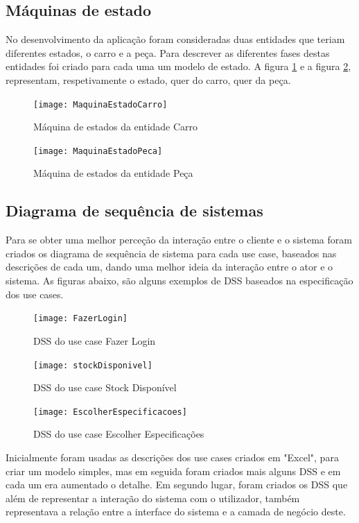 \documentclass[10pt, a4paper]{article}
\begin{document}
\subsection{Máquinas de estado}
No desenvolvimento da aplicação foram consideradas duas entidades que teriam diferentes estados, o carro e a peça. Para descrever as diferentes fases destas entidades foi criado para cada uma um modelo de estado. A figura \ref{ME_Carro} e a figura \ref{ME_Peca}, representam, respetivamente o estado, quer do carro, quer da peça.

\begin{figure}[!htb]
\centering
\texttt{[image: MaquinaEstadoCarro]}
\caption{Máquina de estados da entidade Carro}
\label{ME_Carro}
\end{figure}

\begin{figure}[!htb]
\centering
\texttt{[image: MaquinaEstadoPeca]}
\caption{Máquina de estados da entidade Peça}
\label{ME_Peca}
\end{figure}


\subsection{Diagrama de sequência de sistemas}
Para se obter uma melhor perceção da interação entre o cliente e o sistema foram criados os diagrama de sequência de sistema para cada use case, baseados nas descrições de cada um, dando uma melhor ideia da interação entre o ator e o sistema. As figuras abaixo, são alguns exemplos de DSS baseados na especificação dos use cases.

\begin{figure}[!htb]
\centering
\texttt{[image: FazerLogin]}
\caption{DSS do use case Fazer Login}
\label{DSS FL}
\end{figure}

\begin{figure}[!htb]
\centering
\texttt{[image: stockDisponivel]}
\caption{DSS do use case Stock Disponível}
\label{DSS SD}
\end{figure}

\begin{figure}[!htb]
\centering
\texttt{[image: EscolherEspecificacoes]}
\caption{DSS do use case Escolher Especificações}
\label{DSS EE}
\end{figure}

Inicialmente foram usadas as descrições dos use cases criados em "Excel", para criar um modelo simples, mas em seguida foram criados mais alguns DSS e em cada um era aumentado o detalhe. Em segundo lugar, foram criados os DSS que além de representar a interação do sistema com o utilizador, também representava a relação entre a interface do sistema e a camada de negócio deste.
\end{document}
